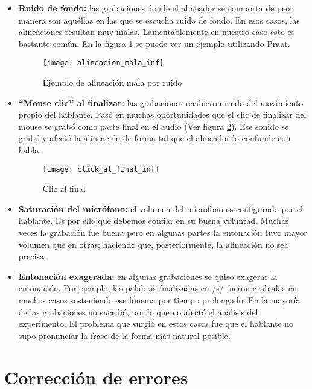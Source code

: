 \begin{itemize}
    \item \textbf{Ruido de fondo:} las grabaciones donde el alineador se comporta de peor manera son aquéllas en las que se escucha ruido de fondo. En esos casos, las alineaciones resultan muy malas. Lamentablemente en nuestro caso esto es bastante común. En la figura \ref{alinMala} se puede ver un ejemplo utilizando Praat.

\begin{figure}[h!]
    \centerline{\texttt{[image: alineacion\_mala\_inf]} }
    \caption{Ejemplo de alineación mala por ruido}
    \label{alinMala}
\end{figure}

    \item \textbf{``Mouse clic’’ al finalizar:} las grabaciones recibieron ruido del movimiento propio del hablante. Pasó en muchas oportunidades que el clic de finalizar del mouse se grabó como parte final en el audio (Ver figura \ref{clickFinal}). Ese sonido se grabó y afectó la alineación de forma tal que el alineador lo confunde con habla.
    
\begin{figure}[h!]
    \centerline{\texttt{[image: click\_al\_final\_inf]} }
    \caption{Clic al final}
    \label{clickFinal}
\end{figure}

    \item \textbf{Saturación del micrófono:} el volumen del micrófono es configurado por el hablante. Es por ello que debemos confiar en su buena voluntad. Muchas veces la grabación fue buena pero en algunas partes la entonación tuvo mayor volumen que en otras; haciendo que, posteriormente, la alineación no sea precisa.
    
    \item \textbf{Entonación exagerada:} en algunas grabaciones se quiso exagerar la entonación. Por ejemplo, las palabras finalizadas en /s/ fueron grabadas en muchos casos sosteniendo ese fonema por tiempo prolongado. En la mayoría de las grabaciones no sucedió, por lo que no afectó el análisis del experimento. El problema que surgió en estos casos fue que el hablante no supo pronunciar la frase de la forma más natural posible. 
    
\end{itemize}

\section{Corrección de errores}

